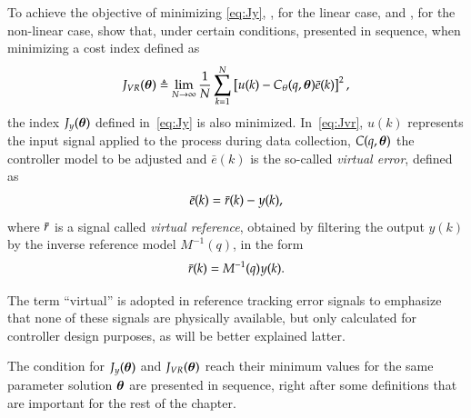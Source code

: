 To achieve the objective of minimizing \eqref{eq:Jy}, \cite{campi2002}, for the linear case, and \cite{campi2006}, for the non-linear case, show that, under certain conditions, presented in sequence, when minimizing a cost index defined as
\begin{equation}
   J_{VR}(\bm{\theta}) \triangleq \lim_{N \to \infty}  \frac{1}{N} \sum_{k=1}^N \left[u(k) - C_\theta(q,\bm{\theta})\bar{e}(k)\right]^2
   \label{eq:Jvr},
\end{equation}
the index $J_y(\bm{\theta})$ defined in~\eqref{eq:Jy} is also minimized. In~\eqref{eq:Jvr}, $u(k)$ represents the input signal applied to the process during data collection, $C (q,\bm{\theta})$ the controller model to be adjusted and $\bar{e}(k)$ is the so-called \textit{virtual error}, defined as
\begin{equation}
   \bar{e}(k) = \bar{r}(k) - y(k) 
   \label{eq:ev},
\end{equation}
where $\bar{r}$ is a signal called \textit{virtual reference}, obtained by filtering the output $y(k)$ by the inverse reference model $M^{-1}(q)$, in the form
\begin{equation}
   \bar{r}(k) = M^{-1}(q)y(k)
   \label{eq:refvirt}.
\end{equation}

The term ``virtual'' is adopted in reference tracking error signals to emphasize that none of these signals are physically available, but only calculated for controller design purposes, as will be better explained latter. 

The condition for  $J_y(\bm{\theta})$ and $J_{VR}(\bm{\theta})$ reach their minimum values for the same parameter solution $\bm{\theta}$ are presented in sequence, right after some definitions that are important for the rest of the chapter.

